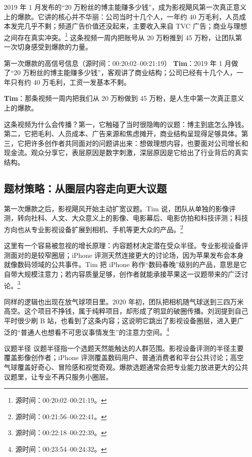 2019 年 1 月发布的“20 万粉丝的博主能赚多少钱”，成为影视飓风第一次真正意义上的爆款。它讲的核心并不华丽：公司当时十几个人，一年约 40 万毛利，人员成本发完几乎不剩；频道广告价值还没起来，主要收入来自 TVC 广告；商业与理想之间存在真实冲突。\footnote{源时间：00:20:02--00:21:19。} 这条视频一周内把账号从 20 万粉推到 45 万粉，让团队第一次切身感受到爆款的力量。

\begin{dialoguebox}{第一次爆款的高信号信息（源时间：00:20:02--00:21:19）}
\textbf{Tim}：2019 年 1 月做了“20 万粉丝的博主能赚多少钱”，客观讲了商业结构；公司已经有十几个人，一年只有约 40 万毛利，工资一发基本不剩。

\textbf{Tim}：那条视频一周内把我们从 20 万粉做到 45 万粉，是人生中第一次真正意义上的爆款。
\end{dialoguebox}

这条视频为什么会传播？第一，它触碰了当时很隐晦的议题：博主到底怎么挣钱。第二，它把毛利、人员成本、广告来源和焦虑摊开，商业结构呈现得足够具体。第三，它把许多创作者共同面对的问题讲出来：想做理想内容，也要面对公司增长和现金流。观众分享它，表层原因是数字刺激，深层原因是它给出了行业背后的真实结构。

\subsection{题材策略：从圈层内容走向更大议题}

第一次爆款之后，影视飓风开始主动扩宽议题。Tim 说，团队从单独的影像评测，转向社科、人文、大众意义上的影像、电影幕后、电影仿拍和科技评测；科技方向也从专业影视设备扩展到相机、手机等更大众的产品。\footnote{源时间：00:21:56--00:22:41。}

这里有一个容易被忽视的增长原理：内容题材决定潜在受众半径。专业影视设备评测面对的是较窄圈层；iPhone 评测天然连接更大的讨论场，因为苹果发布会本身就像数码领域的公共事件。Tim 把 iPhone 称作“数码春晚”级别的产品，意思是它自带大规模注意力；若内容质量足够，创作者就能承接苹果这一议题带来的广泛讨论。\footnote{源时间：00:22:18--00:22:39。}

同样的逻辑也出现在放气球项目里。2020 年初，团队把相机随气球送到三四万米高空。这个项目不挣钱，属于纯粹项目，却形成了明显的破圈传播。刘润提到自己平时很少刷 B 站，也看到了这条内容；这说明它跳出了影视设备圈层，进入更广泛的“普通人也想看不可思议事情发生”的注意力空间。\footnote{源时间：00:23:54--00:24:32。}

\begin{knowledgebox}{议题半径}
议题半径指一个选题天然能触达的人群范围。影视设备评测的半径主要覆盖影像创作者；iPhone 评测覆盖数码用户、普通消费者和平台公共讨论；高空气球覆盖好奇心、冒险感和视觉奇观。爆款选题通常会把专业能力放进更大的公共议题里，让专业不再只服务小圈层。
\end{knowledgebox}

